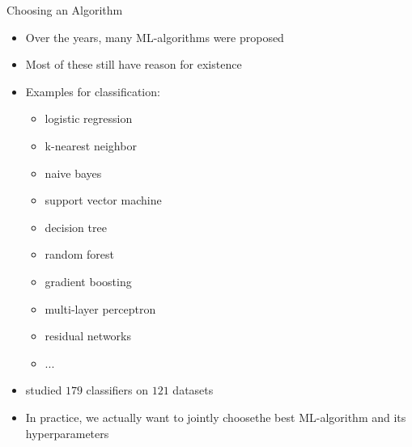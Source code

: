 \begin{frame}[c]{Choosing an Algorithm}

\begin{itemize}
	\item Over the years, many ML-algorithms were proposed
	\pause
	\item Most of these still have reason for existence
	\pause
	\item Examples for classification:
	\begin{itemize}
		\item logistic regression
		\item k-nearest neighbor
		\item naive bayes
		\item support vector machine
		\item decision tree
		\item random forest
		\item gradient boosting
		\item multi-layer perceptron
		\item residual networks
		\item ...
	\end{itemize}
	\pause
	\item {} studied $179$ classifiers on $121$ datasets
	\pause
	\item In practice, we actually want to jointly choose\newline the best ML-algorithm and its hyperparameters
\end{itemize}


\end{frame}
